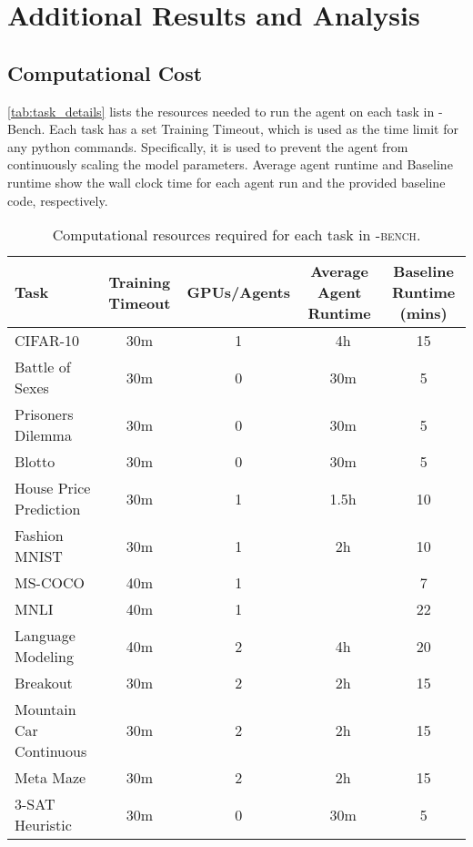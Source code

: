 \section{Additional Results and Analysis}
\label{sec:additional_results}

\subsection{Computational Cost}
\label{sec:cost_analysis_appendix}

\autoref{tab:task_details} lists the resources needed to run the agent on each task in \mlgym-Bench.
Each task has a set Training Timeout, which is used as the time limit for any python commands. 
Specifically, it is used to prevent the agent from continuously scaling the model parameters.
Average agent runtime and Baseline runtime show the wall clock time for each agent run and the provided baseline code, respectively.

\begin{table}[!h]
    \centering
    \begin{adjustbox}{width=\textwidth}
    \begin{NiceTabular}{lcccc}
        \toprule
        Task & Training Timeout & GPUs/Agents & Average Agent Runtime & Baseline Runtime (mins) \\
        \midrule
        CIFAR-10 & 30m & 1 & ~4h & 15 \\
        Battle of Sexes & 30m & 0 & ~30m & 5 \\
        Prisoners Dilemma & 30m & 0 & ~30m & 5 \\
        Blotto & 30m & 0 & ~30m & 5 \\
        House Price Prediction & 30m & 1 & ~1.5h & 10 \\
        Fashion MNIST & 30m & 1 & ~2h & 10 \\
        MS-COCO & 40m & 1 & & 7\\
        MNLI & 40m & 1 & & 22 \\
        Language Modeling & 40m & 2 & ~4h & 20 \\
        Breakout & 30m & 2 & ~2h & 15 \\
        Mountain Car Continuous & 30m & 2 & ~2h & 15 \\
        Meta Maze & 30m & 2 & ~2h & 15 \\
        3-SAT Heuristic & 30m & 0 & ~30m & 5 \\
        \bottomrule
    \end{NiceTabular}
    \end{adjustbox}
    \caption{Computational resources required for each task in \textsc{\mlgym-bench}.}
    \label{tab:task_details}
\end{table}

